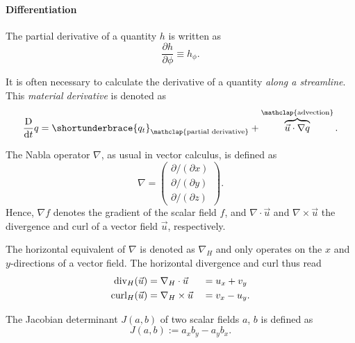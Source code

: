 \paragraph{Differentiation}
\begin{items}
	\item The partial derivative of a quantity \(h\) is written as
	\begin{equation} \frac{\partial h}{\partial \phi} \equiv h_\phi. \end{equation}
	\item It is often necessary to calculate the derivative of a quantity \emph{along a streamline}. This \emph{material derivative} is denoted as
	\begin{equation} \Ddx q = \shortunderbrace{q_t}_{\mathclap{\text{partial derivative}}} + \overbrace{\vec{u} \cdot \nabla q}^{\mathclap{\text{advection}}}. \end{equation}
	\item The Nabla operator \(\nabla\), as usual in vector calculus, is defined as
	\begin{equation} \nabla = \begin{pmatrix} \partial/(\partial x) \\ \partial/(\partial y) \\ \partial/(\partial z) \end{pmatrix}. \end{equation}
	Hence, \(\nabla f\) denotes the gradient of the scalar field \(f\), and \(\nabla \cdot \vec{u}\) and \(\nabla \times \vec{u}\) the divergence and curl of a vector field \(\vec{u}\), respectively.
	\item The horizontal equivalent of \(\nabla\) is denoted as \(\nabla_H\) and only operates on the \(x\) and \(y\)-directions of a vector field. The horizontal divergence and curl thus read
	\begin{alignat}{3}
	\text{div}_H (\vec{u}) &= \nabla_H \cdot \vec{u} &&= u_x + v_y \\
	\text{curl}_H (\vec{u}) &= \nabla_H \times \vec{u} &&= v_x - u_y.
	\end{alignat}
	\item The Jacobian determinant \(J(a,b)\) of two scalar fields \(a\), \(b\) is defined as
	\begin{equation} J(a,b) := a_x b_y - a_y b_x. \end{equation}
\end{items}

